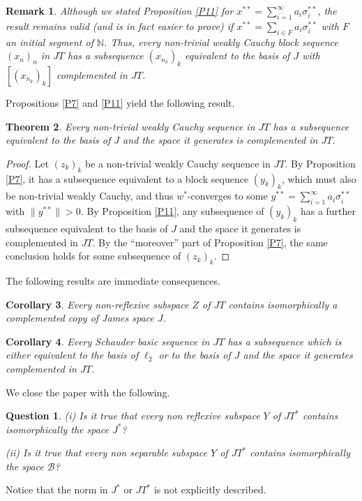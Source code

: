 \documentclass[12pt]{amsart}
\theoremstyle{plain}
\numberwithin{equation}{section}
\newcommand{\N}{\mathbb{N}}
\newcommand{\s}{\sigma}
\newcommand{\B}{\mathcal{B}}
\newtheorem{theorem}{Theorem}[section]
\newtheorem{remark}[theorem]{Remark}
\newtheorem{corollary}[theorem]{Corollary}
\newtheorem*{question}{Question}
\begin{document}
\begin{remark}
Although we stated Proposition \ref{P11} for $x^{**} =\sum_{i=1}^\infty a_i \s_i^{**}$, the result remains valid (and is in fact easier to prove) if $x^{**} =\sum_{i\in F}a_i \s_i^{**}$ with $F$ an initial segment of $\N$. Thus, every non-trivial weakly Cauchy block sequence $(x_n)_n$ in $JT$ has a subsequence $(x_{n_k})_k$ equivalent to the basis of $J$ with $[(x_{n_k})_k]$ complemented in $JT$.
\end{remark}

Propositions \ref{P7} and \ref{P11} yield the following result.

\begin{theorem}
Every non-trivial weakly Cauchy sequence in $JT$ has a subsequence equivalent to the basis of $J$
and  the space it generates is complemented in $JT$.
\end{theorem}

\begin{proof}
Let $(z_k)_k$ be a non-trivial weakly Cauchy sequence in $JT$. By Proposition \ref{P7}, it has a subsequence equivalent to a block sequence $(y_k)_k$, which must also be non-trivial weakly Cauchy, and thus $w^*$-converges to some $y^{**} = \sum_{i=1}^\infty a_i\sigma_i^{**}$ with $\|y^{**}\| >0$. By Proposition \ref{P11}, any subsequence of $(y_k)_k$ has a further subsequence equivalent to the basis of $J$ and the space it generates is complemented in $JT$. By the ``moreover'' part of Proposition \ref{P7}, the same conclusion holds for some subsequence of $(z_k)_k$.
\end{proof}

The following results are immediate consequences.

\begin{corollary}\label{TH_2}
Every non-reflexive subspace $Z$ of $JT$ contains isomorphically  a complemented copy of James space $J$.
\end{corollary}

\begin{corollary}
Every Schauder basic sequence in $JT$ has a subsequence which is either equivalent to the basis of $\ell_2$ or to the basis of $J$ and the space it generates complemented in $JT$.
\end{corollary}
We close the paper with the following.
\begin{question}  (i) Is it true that every non reflexive subspace $Y$ of $JT^*$ contains isomorphically the space $J^*$?

(ii) Is it true that every non separable  subspace $Y$ of $JT^*$ contains isomorphically the space $\B$?
\end{question}
Notice that the norm in $J^*$ or $JT^*$ is not explicitly described.
\bigskip
\end{document}
